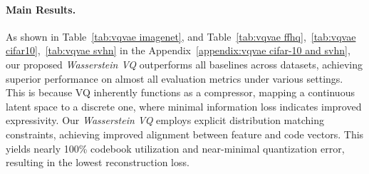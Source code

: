 \paragraph{Main Results.} 
As shown in Table~\ref{tab:vqvae imagenet}, and Table~\ref{tab:vqvae ffhq},~\ref{tab:vqvae cifar10},~\ref{tab:vqvae svhn} in the Appendix~\ref{appendix:vqvae cifar-10 and svhn}, our proposed \emph{Wasserstein VQ} outperforms all baselines across datasets, achieving superior performance on almost all evaluation metrics under various settings. This is because VQ inherently functions as a compressor, mapping a continuous latent space to a discrete one, where minimal information loss indicates improved expressivity. Our \emph{Wasserstein VQ} employs explicit distribution matching constraints, achieving improved alignment between feature and code vectors. This yields nearly 100\% codebook utilization and near-minimal quantization error, resulting in the lowest reconstruction loss.

